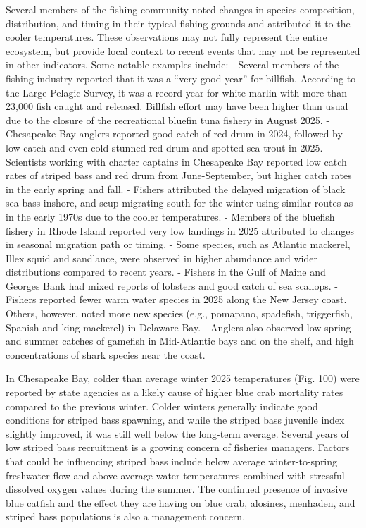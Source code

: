 \documentclass[
  10pt,
]{article}
\begin{document}
Several members of the fishing community noted changes in species composition, distribution, and timing in their typical fishing grounds and attributed it to the cooler temperatures. These observations may not fully represent the entire ecosystem, but provide local context to recent events that may not be represented in other indicators. Some notable examples include:
- Several members of the fishing industry reported that it was a ``very good year'' for billfish. According to the Large Pelagic Survey, it was a record year for white marlin with more than 23,000 fish caught and released. Billfish effort may have been higher than usual due to the closure of the recreational bluefin tuna fishery in August 2025.
- Chesapeake Bay anglers reported good catch of red drum in 2024, followed by low catch and even cold stunned red drum and spotted sea trout in 2025. Scientists working with charter captains in Chesapeake Bay reported low catch rates of striped bass and red drum from June-September, but higher catch rates in the early spring and fall.
- Fishers attributed the delayed migration of black sea bass inshore, and scup migrating south for the winter using similar routes as in the early 1970s due to the cooler temperatures.
- Members of the bluefish fishery in Rhode Island reported very low landings in 2025 attributed to changes in seasonal migration path or timing.
- Some species, such as Atlantic mackerel, Illex squid and sandlance, were observed in higher abundance and wider distributions compared to recent years.
- Fishers in the Gulf of Maine and Georges Bank had mixed reports of lobsters and good catch of sea scallops.
- Fishers reported fewer warm water species in 2025 along the New Jersey coast. Others, however, noted more new species (e.g., pomapano, spadefish, triggerfish, Spanish and king mackerel) in Delaware Bay.
- Anglers also observed low spring and summer catches of gamefish in Mid-Atlantic bays and on the shelf, and high concentrations of shark species near the coast.

In Chesapeake Bay, colder than average winter 2025 temperatures (Fig. 100) were reported by state agencies as a likely cause of higher blue crab mortality rates compared to the previous winter. Colder winters generally indicate good conditions for striped bass spawning, and while the striped bass juvenile index slightly improved, it was still well below the long-term average. Several years of low striped bass recruitment is a growing concern of fisheries managers. Factors that could be influencing striped bass include below average winter-to-spring freshwater flow and above average water temperatures combined with stressful dissolved oxygen values during the summer. The continued presence of invasive blue catfish and the effect they are having on blue crab, alosines, menhaden, and striped bass populations is also a management concern.
\end{document}
